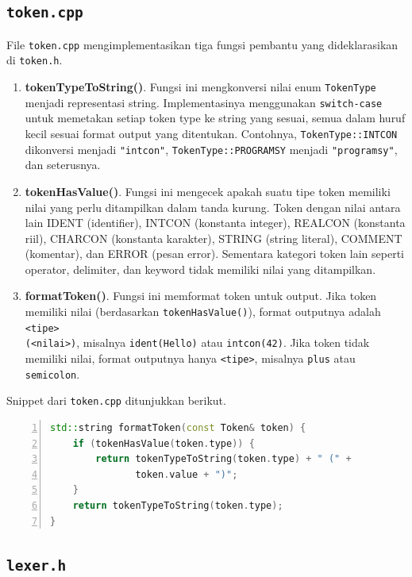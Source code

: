 \subsection{\texttt{token.cpp}}

File \texttt{token.cpp} mengimplementasikan tiga fungsi pembantu yang dideklarasikan di \texttt{token.h}.

\begin{enumerate}
    \item \textbf{tokenTypeToString()}. Fungsi ini mengkonversi nilai enum \texttt{TokenType} menjadi representasi string. Implementasinya menggunakan \texttt{switch-case} untuk memetakan setiap token type ke string yang sesuai, semua dalam huruf kecil sesuai format output yang ditentukan. Contohnya, \texttt{TokenType::INTCON} dikonversi menjadi \texttt{"intcon"}, \texttt{TokenType::PROGRAMSY} menjadi \texttt{"programsy"}, dan seterusnya.
    \item \textbf{tokenHasValue()}. Fungsi ini mengecek apakah suatu tipe token memiliki nilai yang perlu ditampilkan dalam tanda kurung. Token dengan nilai antara lain IDENT (identifier), INTCON (konstanta integer), REALCON (konstanta riil), CHARCON (konstanta karakter), STRING (string literal), COMMENT (komentar), dan ERROR (pesan error). Sementara kategori token lain seperti operator, delimiter, dan keyword tidak memiliki nilai yang ditampilkan.
    \item \textbf{formatToken()}. Fungsi ini memformat token untuk output. Jika token memiliki nilai (berdasarkan \texttt{tokenHasValue()}), format outputnya adalah \texttt{<tipe> \\(<nilai>)}, misalnya \texttt{ident(Hello)} atau \texttt{intcon(42)}. Jika token tidak memiliki nilai, format outputnya hanya \texttt{<tipe>}, misalnya \texttt{plus} atau \texttt{semicolon}.
\end{enumerate}
Snippet dari \texttt{token.cpp} ditunjukkan berikut.

\begin{lstlisting}[language=C++, numbers=left, numberstyle=\tiny, caption={Implementasi formatToken() dari token.cpp}, label={lst:format-token}]
std::string formatToken(const Token& token) {
    if (tokenHasValue(token.type)) {
        return tokenTypeToString(token.type) + " (" + 
               token.value + ")";
    }
    return tokenTypeToString(token.type);
}
\end{lstlisting}

\subsection{\texttt{lexer.h}}

